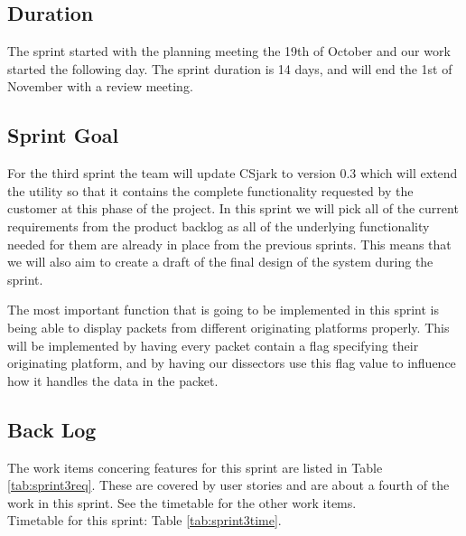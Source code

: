 \subsection{Duration}

The sprint started with the planning meeting the 19th of October and our work started the following day. The sprint duration is 14 days, and will end the 1st of November with a review meeting. 


\subsection{Sprint Goal}
For the third sprint the team will update CSjark to version 0.3 which will extend the \gls{utility} so that it contains the complete functionality requested by the customer at this phase of the project. In this sprint we will pick all of the current requirements from the product backlog as all of the underlying functionality needed for them are already in place from the previous sprints. This means that we will also aim to create a draft of the final design of the system during the sprint.

The most important function that is going to be implemented in this sprint is being able to display \glspl{packet} from different originating platforms properly. This will be implemented by having every \gls{packet} contain a flag specifying their originating platform, and by having our \glspl{dissector} use this flag value to influence how it handles the data in the \gls{packet}.

\subsection{Back Log}
The work items concering features for this sprint are listed in Table \ref{tab:sprint3req}. These are covered by user stories and are about a fourth of the work in this sprint. See the timetable for the other work items.\\
Timetable for this sprint: Table \ref{tab:sprint3time}. \\

